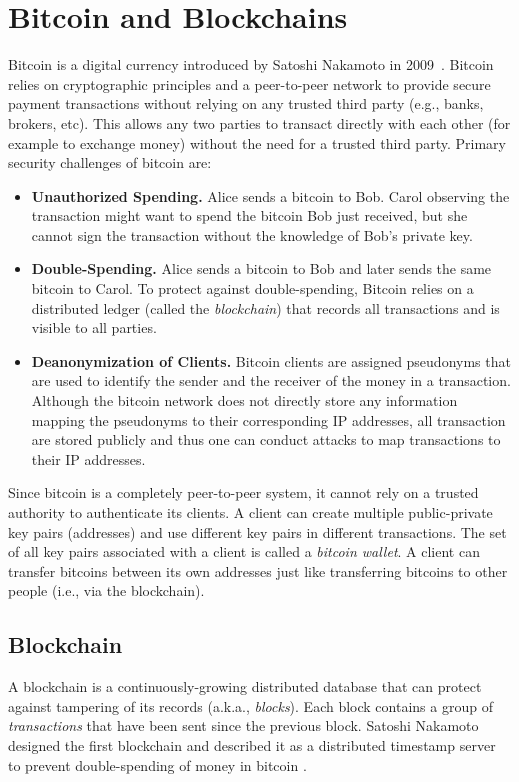 \documentclass[11pt]{article}
\theoremstyle{plain}
\begin{document}
\section{Bitcoin and Blockchains}

Bitcoin is a digital currency introduced by Satoshi Nakamoto in 2009~\cite{nakamoto08bitcoin}.
Bitcoin relies on cryptographic principles and a peer-to-peer network
to provide secure payment transactions without relying on any trusted
third party (e.g., banks, brokers, etc). This allows any two parties
to transact directly with each other (for example to exchange money)
without the need for a trusted third party. Primary security challenges
of bitcoin are:
\begin{itemize}
	\item \textbf{Unauthorized Spending.} Alice sends a bitcoin to Bob. Carol
	observing the transaction might want to spend the bitcoin Bob just
	received, but she cannot sign the transaction without the knowledge
	of Bob's private key.
	\item \textbf{Double-Spending. }Alice sends a bitcoin to Bob and later sends
	the same bitcoin to Carol. To protect against double-spending, Bitcoin
	relies on a distributed ledger (called the \emph{blockchain}) that
	records all transactions and is visible to all parties.
	\item \textbf{Deanonymization of Clients. }Bitcoin clients are assigned
	pseudonyms\textbf{ }that are used to identify the sender and the receiver
	of the money in a transaction. Although the bitcoin network does not
	directly store any information mapping the pseudonyms to their corresponding
	IP addresses, all transaction are stored publicly and thus one can
	conduct attacks to map transactions to their IP addresses.
\end{itemize}
Since bitcoin is a completely peer-to-peer system, it cannot rely
on a trusted authority to authenticate its clients. A client can create
multiple public-private key pairs (addresses) and use different key
pairs in different transactions. The set of all key pairs associated
with a client is called a \emph{bitcoin wallet}. A client can transfer
bitcoins between its own addresses just like transferring bitcoins
to other people (i.e., via the blockchain).

\subsection{Blockchain}

A blockchain is a continuously-growing distributed database that can
protect against tampering of its records (a.k.a., \emph{blocks}).
Each block contains a group of \emph{transactions} that have been
sent since the previous block. Satoshi Nakamoto designed the first
blockchain and described it as a distributed timestamp server to prevent
double-spending of money in bitcoin \cite{nakamoto08bitcoin}.
\end{document}
